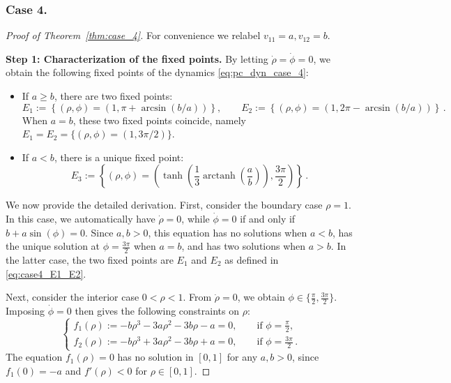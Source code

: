 \documentclass[10pt]{article}
\theoremstyle{definition}
\theoremstyle{definition}
\numberwithin{equation}{section}
\newcommand{\Drho}{\Dot{\rho}}
\newcommand{\Dphi}{\Dot{\phi}}
\begin{document}
\subsubsection*{Case 4.}
\begin{proof}[Proof of Theorem~\ref{thm:case_4}]
\label{proof:case_4}
For convenience we relabel $v_{11} = a, v_{12} = b$.

\textbf{Step 1: Characterization of the fixed points.}
By letting $\Drho = \Dphi = 0$, we obtain the following fixed points of the dynamics \eqref{eq:pc_dyn_case_4}:
\begin{itemize}
    \item If $a \geq b$, there are two fixed points:
    \begin{equation}\label{eq:case4_E1_E2}
    E_1 := \left\{ (\rho, \phi) = (1, \pi + \arcsin(b/a)) \right\}, \qquad E_2 := \left\{ (\rho, \phi) = (1, 2\pi - \arcsin(b/a)) \right\} \, .
    \end{equation}
    When $a=b$, these two fixed points coincide, namely $E_1 = E_2 = \{(\rho, \phi) = (1, 3\pi/2)\}$.
    
    \item If $a < b$, there is a unique fixed point:
    \begin{equation}\label{eq:case4_E3}
    E_3 := \left\{(\rho,\phi)=\left(\tanh\!\left(\frac{1}{3}\operatorname{arctanh}\!\left(\frac{a}{b}\right)\right),\frac{3\pi}{2}\right)\right\} \, . 
    \end{equation}
\end{itemize}
We now provide the detailed derivation. First, consider the boundary case $\rho=1$.
In this case, we automatically have $\Drho = 0$, while $\Dphi = 0$ if and only if $b + a \sin(\phi) = 0$.
Since $a, b > 0$, this equation has no solutions when $a < b$, has the unique solution at $\phi = \frac{3\pi}{2}$ when $a = b$, and has two solutions when $a > b$.  
In the latter case, the two fixed points are $E_1$ and $E_2$ as defined in \eqref{eq:case4_E1_E2}.

Next, consider the interior case $0 < \rho < 1$.
From $\Drho = 0$, we obtain $\phi \in \{\frac{\pi}{2}, \frac{3\pi}{2}\}$.  
Imposing $\Dphi = 0$ then gives the following constraints on $\rho$:
\begin{equation*}
    \begin{cases}
        f_1(\rho) := -b \rho^3 - 3a \rho^2 - 3b\rho - a = 0, \qquad \text{if } \phi = \frac{\pi}{2},\\[4pt]
        f_2(\rho) := -b \rho^3 + 3a \rho^2 - 3b\rho + a = 0, \qquad \text{if } \phi = \frac{3\pi}{2} \, .
    \end{cases}
\end{equation*}
The equation $f_1(\rho) = 0$ has no solution in $[0,1]$ for any $a,b > 0$,  since $f_1(0) = -a$ and $f'(\rho) < 0$ for $\rho \in [0,1]$. 


\end{proof}
\end{document}
